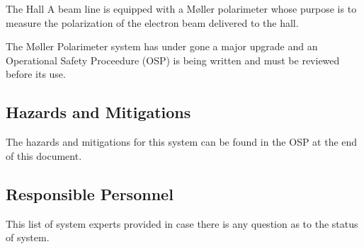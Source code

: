 
The Hall A beam line is equipped with a M{\o}ller 
polarimeter
whose purpose is 
to measure the polarization of the electron beam delivered to the hall. 

\begin{safetyen}{0}{0}

The M{\o}ller Polarimeter system has under gone a major upgrade and an Operational Safety Proceedure (OSP)
is being written and must be reviewed before its use.

\subsection{Hazards and Mitigations}

The hazards and mitigations for this system can be found in the OSP at the end of this document. 


\subsection{Responsible Personnel}
\label{sec:moller-pers}

This list of system experts provided in case there is any question as to the status of system.


\end{safetyen}
